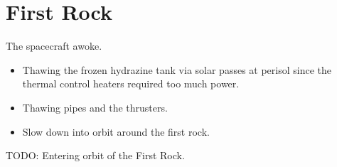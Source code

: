 %
%

\chapter{First Rock}

The spacecraft awoke.

\begin{itemize}
\item Thawing the frozen hydrazine tank via solar passes at perisol since the thermal control heaters required too much power.
\item Thawing pipes and the thrusters.
\item Slow down into orbit around the first rock.
\end{itemize}

TODO: Entering orbit of the First Rock.

\newpage
\thispagestyle{empty}
